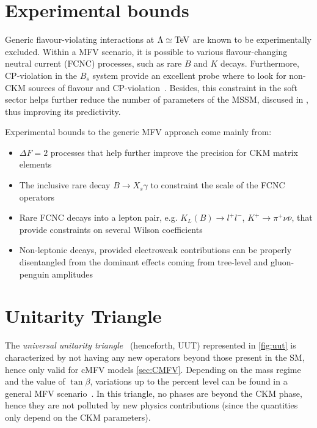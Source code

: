 \section{Experimental bounds}
\label{sec:MFVExp}
Generic flavour-violating interactions at $\Lambda \simeq \rm TeV$ are known to be experimentally excluded. 
Within a MFV scenario, it is possible to  various flavour-changing neutral current (FCNC) processes, such as rare $B$ and $K$ decays. Furthermore, CP-violation in the $B_s$ system provide an excellent probe where to look for non-CKM sources of flavour and CP-violation~\cite{Altmannshofer:2007cs}. Besides, this constraint in the soft sector helps further reduce the number of parameters of the MSSM, discused in , thus improving its predictivity. 

Experimental bounds to the generic MFV approach come mainly from:
\begin{itemize}
\item $\Delta F = 2$ processes that help further improve the precision for CKM matrix elements
\item The inclusive rare decay $B \rightarrow X_s \gamma$  to constraint the scale of the FCNC operators 
\item Rare FCNC decays into a lepton pair, e.g. $K_L(B) \rightarrow l^+ l^-$, $K^+ \rightarrow \pi^+ \nu \bar{\nu}$, that provide constraints on several Wilson coefficients %
\item Non-leptonic decays, provided electroweak contributions can be properly disentangled from the dominant effects coming from tree-level and gluon-penguin amplitudes %
\end{itemize}

\section{Unitarity Triangle}
\label{sec:UT}

The \textit{universal unitarity triangle}~\cite{Buras:2000dm} (henceforth, UUT) represented in \ref{fig:uut} is characterized by not having any new operators beyond those present in the SM, hence only valid for cMFV models \ref{sec:CMFV}. Depending on the mass regime and the value of $\tan{\beta}$, variations up to the percent level can be found in a general MFV scenario~\cite{Altmannshofer:2007cs}. 
In this triangle, no phases are beyond the CKM phase, hence they are not polluted by new physics contributions (since the quantities only depend on the CKM parameters).  

